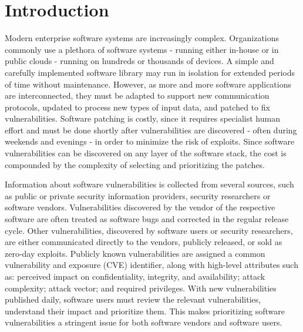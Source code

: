 {\section{Introduction}
\label{sec:introduction}

Modern enterprise software systems are increasingly complex.
Organizations commonly use a plethora of software systems - running either in-house or in public clouds - running on hundreds or thousands of devices.
A simple and carefully implemented software library may run in isolation for extended periods of time without maintenance.
However, as more and more software applications are interconnected, they must be adapted to support new communication protocols, updated to process new types of input data, and patched to fix vulnerabilities.
Software patching is costly, since it requires specialist human effort and must be done shortly after vulnerabilities are discovered - often during weekends and evenings - in order to minimize the risk of exploits.
Since software vulnerabilities can be discovered on any layer of the software stack, the cost is compounded by the complexity of selecting and prioritizing the patches.

Information about software vulnerabilities is collected from several sources, such as public or private security information providers, security researchers or software vendors.
Vulnerabilities discovered by the vendor of the respective software are often treated as software bugs and corrected in the regular release cycle.
Other vulnerabilities, discovered by software users or security researchers, are either communicated directly to the vendors, publicly released, or sold as zero-day exploits.
Publicly known vulnerabilities are assigned a common vulnerability and exposure (CVE) identifier, along with high-level attributes such as: 
perceived impact on confidentiality, integrity, and availability; 
attack complexity; 
attack vector; 
and required privileges.
With new vulnerabilities published daily, software users must review the relevant vulnerabilities, understand their impact and prioritize them. 
This makes prioritizing software vulnerabilities a stringent issue for both software vendors and software users.

}
